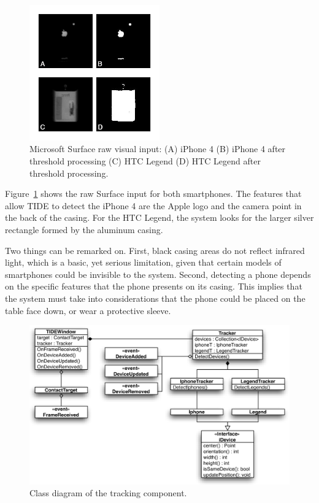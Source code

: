 \begin{figure}[htbp]
  \centering
    \includegraphics[width=0.5\textwidth]{images/msRaw}
    \caption{Microsoft Surface raw visual input: (A) iPhone 4 (B) iPhone 4 after threshold processing (C) HTC Legend (D) HTC Legend after threshold processing.}
    \label{fig:msRaw}
\end{figure}

Figure~\ref{fig:msRaw} shows the raw Surface input for both smartphones.
The features that allow TIDE to detect the iPhone 4 are the Apple logo and the camera point in the back of the casing.
For the HTC Legend, the system looks for the larger silver rectangle formed by the aluminum casing.

Two things can be remarked on.
First, black casing areas do not reflect infrared light, which is a basic, yet serious limitation, given that certain models of smartphones could be invisible to the system.
Second, detecting a phone depends on the specific features that the phone presents on its casing.
This implies that the system must take into considerations that the phone could be placed on the table face down, or wear a protective sleeve.

\begin{figure}[htbp]
  \centering
    \includegraphics[width=1\textwidth]{images/trackingDiagram}
    \caption{Class diagram of the tracking component.}
    \label{fig:trackingDiagram}
\end{figure}

